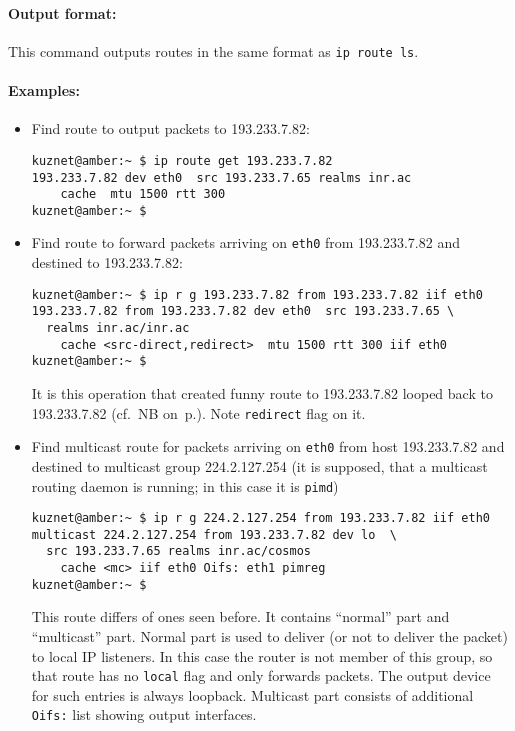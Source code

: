 \paragraph{Output format:} This command outputs routes in the same
format as \verb|ip route ls|.

\paragraph{Examples:} 
\begin{itemize}
\item Find route to output packets to 193.233.7.82:
\begin{verbatim}
kuznet@amber:~ $ ip route get 193.233.7.82
193.233.7.82 dev eth0  src 193.233.7.65 realms inr.ac
    cache  mtu 1500 rtt 300
kuznet@amber:~ $
\end{verbatim}

\item Find route to forward packets arriving on \verb|eth0|
from 193.233.7.82 and destined to 193.233.7.82:
\begin{verbatim}
kuznet@amber:~ $ ip r g 193.233.7.82 from 193.233.7.82 iif eth0
193.233.7.82 from 193.233.7.82 dev eth0  src 193.233.7.65 \
  realms inr.ac/inr.ac 
    cache <src-direct,redirect>  mtu 1500 rtt 300 iif eth0
kuznet@amber:~ $
\end{verbatim}
\begin{NB}
  \label{NB-nature-of-strangeness}
  It is this operation that created funny route to 193.233.7.82
  looped back to 193.233.7.82 (cf.\ NB on~p.\pageref{NB-strange-route}).
  Note \verb|redirect| flag on it.
\end{NB}

\item Find multicast route for packets arriving on \verb|eth0|
from host 193.233.7.82 and destined to multicast group 224.2.127.254
(it is supposed, that a multicast routing daemon is running;
in this case it is \verb|pimd|)
\begin{verbatim}
kuznet@amber:~ $ ip r g 224.2.127.254 from 193.233.7.82 iif eth0
multicast 224.2.127.254 from 193.233.7.82 dev lo  \
  src 193.233.7.65 realms inr.ac/cosmos 
    cache <mc> iif eth0 Oifs: eth1 pimreg
kuznet@amber:~ $
\end{verbatim}
This route differs of ones seen before. It contains ``normal'' part
and ``multicast'' part. Normal part is used to deliver (or not to
deliver the packet) to local IP listeners. In this case the router
is not member
of this group, so that route has no \verb|local| flag and only
forwards packets. The output device for such entries is always loopback.
Multicast part consists of additional \verb|Oifs:| list showing
output interfaces.
\end{itemize}


